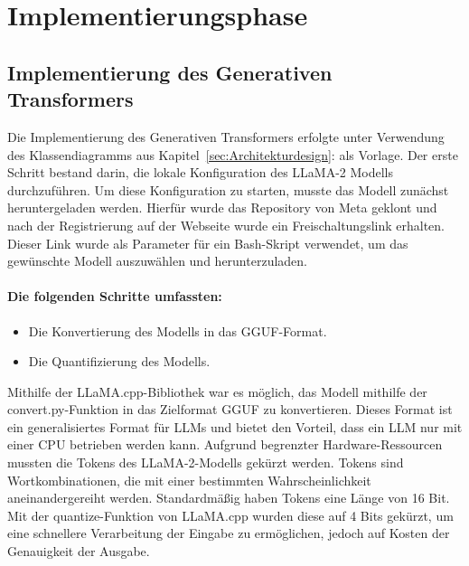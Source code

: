 \section{Implementierungsphase} 
\label{sec:Implementierungsphase}

\subsection{Implementierung des Generativen Transformers}
\label{sec:ImplementierungGenerativenTransformers}
Die Implementierung des Generativen Transformers erfolgte unter Verwendung des Klassendiagramms 
aus Kapitel~\ref{sec:Architekturdesign}:  als Vorlage.
Der erste Schritt bestand darin, die lokale Konfiguration des \ac{LLaMA}-2 Modells durchzuführen. 
Um diese Konfiguration zu starten, musste das Modell zunächst heruntergeladen werden.
Hierfür wurde das Repository von Meta geklont und nach der Registrierung auf der Webseite wurde ein 
Freischaltungslink erhalten. Dieser Link wurde als Parameter für ein Bash-Skript verwendet, 
um das gewünschte Modell auszuwählen und herunterzuladen.

\paragraph{Die folgenden Schritte umfassten:} 
\begin{itemize}
	\item Die Konvertierung des Modells in das \ac{GGUF}-Format.
	\item Die Quantifizierung des Modells.
\end{itemize}

Mithilfe der \ac{LLaMA}.cpp-Bibliothek war es möglich, das Modell mithilfe der convert.py-Funktion
in das Zielformat GGUF zu konvertieren. Dieses Format ist ein generalisiertes Format für \ac{LLM}s 
und bietet den Vorteil, dass ein \ac{LLM} nur mit einer CPU betrieben werden kann. 
Aufgrund begrenzter Hardware-Ressourcen mussten die Tokens des \ac{LLaMA}-2-Modells gekürzt werden. 
Tokens sind Wortkombinationen, die mit einer bestimmten Wahrscheinlichkeit aneinandergereiht werden. 
Standardmäßig haben Tokens eine Länge von 16 Bit. Mit der quantize-Funktion von \ac{LLaMA}.cpp wurden 
diese auf 4 Bits gekürzt, um eine schnellere Verarbeitung der Eingabe zu ermöglichen, 
jedoch auf Kosten der Genauigkeit der Ausgabe.





